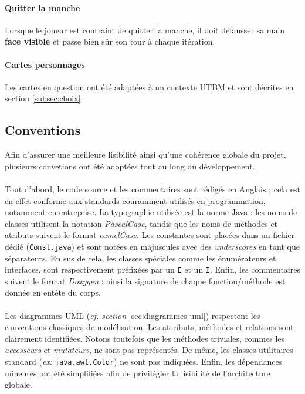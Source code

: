 \documentclass[paper=a4,fontsize=12pt,titlepage]{scrartcl}
\begin{document}
    \paragraph{Quitter la manche} Lorsque le joueur est contraint de quitter la manche, il doit défausser sa main \textbf{face visible}
    et passe bien sûr son tour à chaque itération.

    \paragraph{Cartes personnages} Les cartes en question ont été adaptées à un contexte UTBM et sont décrites en section \ref{subsec:choix}.

    \subsection{Conventions}\label{subsec:conventions}

    Afin d'assurer une meilleure lisibilité ainsi qu'une cohérence globale du projet, plusieurs convetions ont été
    adoptées tout au long du développement.

    \paragraph{} Tout d'abord, le code source et les commentaires sont rédigés en Anglais ; cela est en effet conforme
    aux standards couramment utilisés en programmation, notamment en entreprise. La typographie utilisée est la norme
    Java : les noms de classes utilisent la notation \textit{PascalCase}, tandis que les noms de méthodes et atributs
    suivent le format \textit{camelCase}. Les constantes sont placées dans un fichier dédié (\verb|Const.java|) et
    sont notées en majuscules avec des \textit{underscores} en tant que séparateurs. En sus de cela, les classes spéciales
    comme les énumérateurs et interfaces, sont respectivement préfixées par un \verb|E| et un \verb|I|. Enfin, les
    commentaires suivent le format \textit{Doxygen} ; ainsi la signature de chaque fonction/méthode est donnée en entête
    du corps.

    \paragraph{} Les diagrammes UML (\textit{cf. section} \ref{sec:diagrammes-uml}) respectent les conventions classiques de modélisation. Les attributs, méthodes et relations
    sont clairement identifiées. Notons toutefois que les méthodes triviales, commes les \textit{accesseurs} et \textit{mutateurs},
    ne sont pas représentés. De même, les classes utilitaires standard (\textit{ex:} \verb|java.awt.Color|)
    ne sont pas indiquées. Enfin, les dépendances mineures ont été simplifiées afin de privilégier la lisibilité
    de l'architecture globale.
\end{document}
